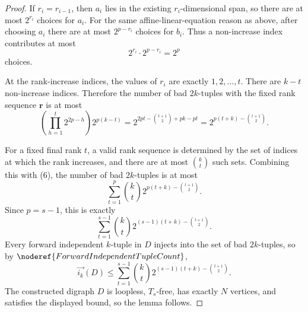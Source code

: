 \begin{proof}
If \(r_i=r_{i-1}\), then \(a_i\) lies in the existing \(r_i\)-dimensional span, so there are at most \(2^{r_i}\) choices for \(a_i\). For the same affine-linear-equation reason as above, after choosing \(a_i\) there are at most \(2^{p-r_i}\) choices for \(b_i\). Thus a non-increase index contributes at most
\[
  2^{r_i}\cdot 2^{p-r_i}=2^p
\]
choices.

At the rank-increase indices, the values of \(r_i\) are exactly \(1,2,\ldots,t\). There are \(k-t\) non-increase indices. Therefore the number of bad \(2k\)-tuples with the fixed rank sequence \(\mathbf r\) is at most
\[
  \left(\prod_{h=1}^{t}2^{2p-h}\right)2^{p(k-t)}
  =2^{2pt-\binom{t+1}{2}+pk-pt}
  =2^{p(t+k)-\binom{t+1}{2}}. \tag{6}
\]

For a fixed final rank \(t\), a valid rank sequence is determined by the set of indices at which the rank increases, and there are at most \(\binom{k}{t}\) such sets. Combining this with (6), the number of bad \(2k\)-tuples is at most
\[
  \sum_{t=1}^{p}\binom{k}{t}
    2^{p(t+k)-\binom{t+1}{2}}.
\]
Since \(p=s-1\), this is exactly
\[
  \sum_{t=1}^{s-1}\binom{k}{t}
    2^{(s-1)(t+k)-\binom{t+1}{2}}.
\]
Every forward independent \(k\)-tuple in \(D\) injects into the set of bad \(2k\)-tuples, so by \(\noderef{ForwardIndependentTupleCount}\),
\[
  \overrightarrow{i_k}(D)\le
  \sum_{t=1}^{s-1}\binom{k}{t}
    2^{(s-1)(t+k)-\binom{t+1}{2}}.
\]
The constructed digraph \(D\) is loopless, \(T_s\)-free, has exactly \(N\) vertices, and satisfies the displayed bound, so the lemma follows.
\end{proof}
